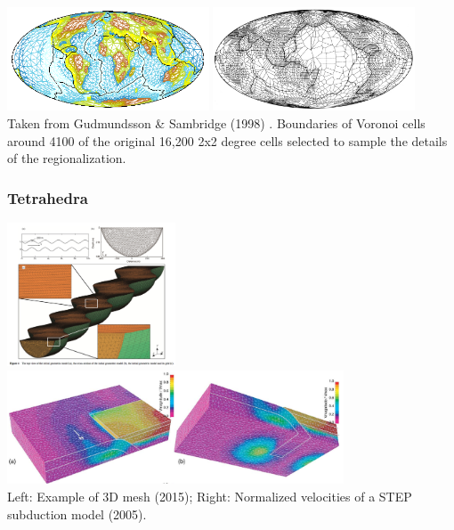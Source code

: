 
\begin{center}
\includegraphics[width=6cm]{images/meshes/gusa98a}
\includegraphics[width=6cm]{images/meshes/gusa98b}\\
{\captionfont Taken from Gudmundsson \& Sambridge (1998) \cite{gusa98}.
Boundaries of Voronoi cells around 4100 of the original 16,200 2x2 degree cells
selected to sample the details of the regionalization.}
\end{center}


\subsubsection{Tetrahedra}

\begin{center}
\includegraphics[width=5cm]{images/meshes/glacier}
\includegraphics[width=10cm]{images/meshes/gowo05}\\
{\captionfont 
Left: Example of 3D mesh \textcite{yash15} (2015);
Right: Normalized velocities of a STEP subduction model \textcite{gowo05} (2005).
}
\end{center}

